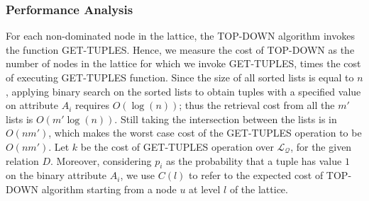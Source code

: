 \subsubsection{Performance Analysis}\label{sec:TOP-DOWN-performance}
For each non-dominated node in the lattice, the TOP-DOWN algorithm invokes the function GET-TUPLES. Hence, we measure the cost of TOP-DOWN as the number of nodes in the lattice for which we invoke GET-TUPLES, times the cost of executing GET-TUPLES function.
Since the size of all sorted lists is equal to $n$, applying binary search on the sorted lists to obtain tuples with a specified value 
on attribute $A_i$ requires $O(\log(n))$; thus the retrieval cost from all the $m'$ lists is $O(m'\log(n))$. Still taking the intersection between the lists is in $O(nm')$, which makes the worst case cost of the GET-TUPLES operation to be $O(nm')$. %
Let $k$ be the cost of GET-TUPLES operation over $\mathcal{L_Q}$, for the given relation $D$.
Moreover, considering $p_i$ as the probability that a tuple has value $1$ on the binary attribute $A_i$, we use $C(l)$ to refer to the expected cost of
 TOP-DOWN algorithm starting from a node $u$ at level $l$ of the lattice. %

